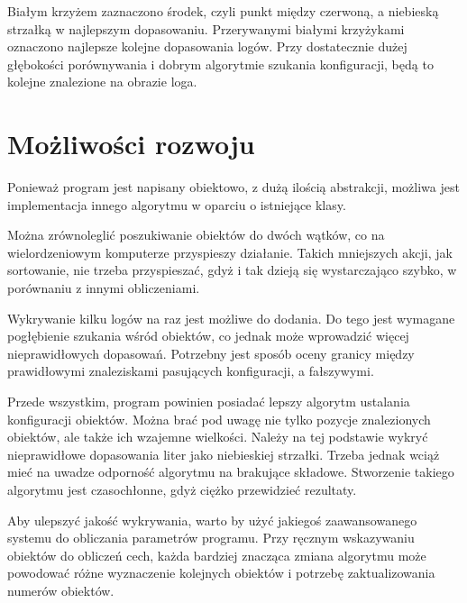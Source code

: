 \documentclass[a4paper,12pt]{article}
\begin{document}
		Białym krzyżem zaznaczono środek, czyli punkt między czerwoną, a niebieską strzałką w najlepszym dopasowaniu.
		Przerywanymi białymi krzyżykami oznaczono najlepsze kolejne dopasowania logów. Przy dostatecznie dużej głębokości porównywania i dobrym algorytmie szukania konfiguracji, będą to kolejne znalezione na obrazie loga.
		
	\section{Możliwości rozwoju}
		Ponieważ program jest napisany obiektowo, z dużą ilością abstrakcji, możliwa jest implementacja innego algorytmu w oparciu o istniejące klasy.
		
		Można zrównoleglić poszukiwanie obiektów do dwóch wątków, co na wielordzeniowym komputerze przyspieszy działanie.
		Takich mniejszych akcji, jak sortowanie, nie trzeba przyspieszać, gdyż i tak dzieją się wystarczająco szybko, w porównaniu z innymi obliczeniami.
		
		Wykrywanie kilku logów na raz jest możliwe do dodania.
		Do tego jest wymagane pogłębienie szukania wśród obiektów, co jednak może wprowadzić więcej nieprawidłowych dopasowań.
		Potrzebny jest sposób oceny granicy między prawidłowymi znaleziskami pasujących konfiguracji, a fałszywymi.
		
		Przede wszystkim, program powinien posiadać lepszy algorytm ustalania konfiguracji obiektów.
		Można brać pod uwagę nie tylko pozycje znalezionych obiektów, ale także ich wzajemne wielkości.
		Należy na tej podstawie wykryć nieprawidłowe dopasowania liter jako niebieskiej strzałki.
		Trzeba jednak wciąż mieć na uwadze odporność algorytmu na brakujące składowe.
		Stworzenie takiego algorytmu jest czasochłonne, gdyż ciężko przewidzieć rezultaty.
		
		Aby ulepszyć jakość wykrywania, warto by użyć jakiegoś zaawansowanego systemu do obliczania parametrów programu.
		Przy ręcznym wskazywaniu obiektów do obliczeń cech, każda bardziej znacząca zmiana algorytmu może powodować różne wyznaczenie kolejnych obiektów i potrzebę zaktualizowania numerów obiektów.
		
\end{document}
